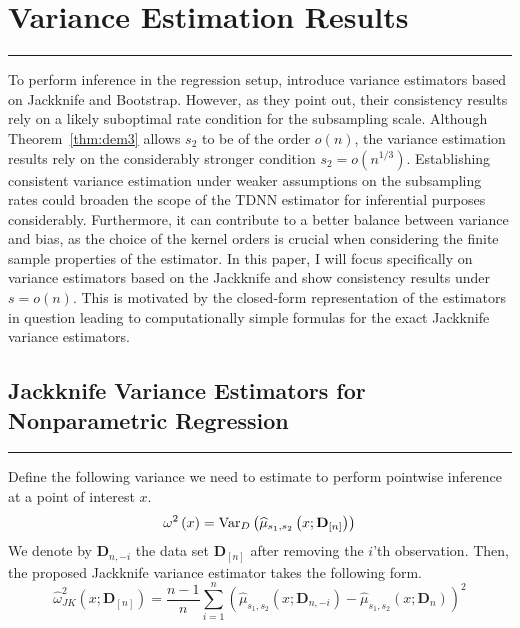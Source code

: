\section{Variance Estimation Results}\label{sec:pw_inf}
\hrule
To perform inference in the regression setup, \citet{demirkaya_optimal_2024} introduce variance estimators based on Jackknife and Bootstrap.
However, as they point out, their consistency results rely on a likely suboptimal rate condition for the subsampling scale.
Although Theorem~\ref{thm:dem3} allows $s_2$ to be of the order $o(n)$, the variance estimation results rely on the considerably stronger condition $s_2 = o(n^{1/3})$.
Establishing consistent variance estimation under weaker assumptions on the subsampling rates could broaden the scope of the TDNN estimator for inferential purposes considerably.
Furthermore, it can contribute to a better balance between variance and bias, as the choice of the kernel orders is crucial when considering the finite sample properties of the estimator.
In this paper, I will focus specifically on variance estimators based on the Jackknife and show consistency results under $s = o(n)$.
This is motivated by the closed-form representation of the estimators in question leading to computationally simple formulas for the exact Jackknife variance estimators.

\subsection{Jackknife Variance Estimators for Nonparametric Regression}\label{Var_Ests}
\hrule

Define the following variance we need to estimate to perform pointwise inference at a point of interest $x$.
\begin{equation}\label{eq:TDNN_Var}
	\omega^{2}\left(x\right)
	= \text{Var}_{D}\left(\widehat{\mu}_{s_1, s_2}\left(x; \mathbf{D}_{[n]}\right)\right)
\end{equation}
We denote by $\mathbf{D}_{n, -i}$ the data set $\mathbf{D}_{[n]}$ after removing the $i$'th observation.
Then, the proposed Jackknife variance estimator takes the following form.
\begin{equation}\label{eq:JK_Var_Est}
	\hat{\omega}_{JK}^2\left(x; \mathbf{D}_{[n]}\right)
	= \frac{n-1}{n} \sum_{i = 1}^{n}\left(\hat{\mu}_{s_1, s_2}\left(x; \mathbf{D}_{n, -i}\right) - \hat{\mu}_{s_1, s_2}\left(x; \mathbf{D}_{n}\right)\right)^2
\end{equation}

